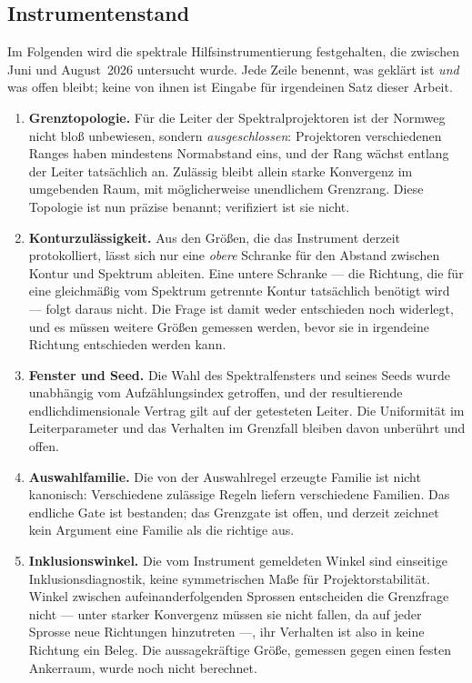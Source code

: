 \documentclass[12pt,a4paper]{article}
\theoremstyle{definition}
\theoremstyle{remark}
\begin{document}
\subsection{Instrumentenstand}

Im Folgenden wird die spektrale Hilfsinstrumentierung festgehalten, die
zwischen Juni und August~2026 untersucht wurde.  Jede Zeile benennt, was
geklärt ist \emph{und} was offen bleibt; keine von ihnen ist Eingabe für
irgendeinen Satz dieser Arbeit.
\begin{enumerate}[label=(I\arabic*)]
\item \textbf{Grenztopologie.}  Für die Leiter der Spektralprojektoren
  ist der Normweg nicht bloß unbewiesen, sondern \emph{ausgeschlossen}:
  Projektoren verschiedenen Ranges haben mindestens Normabstand eins,
  und der Rang wächst entlang der Leiter tatsächlich an.  Zulässig
  bleibt allein starke Konvergenz im umgebenden Raum, mit
  möglicherweise unendlichem Grenzrang.  Diese Topologie ist nun präzise
  benannt; verifiziert ist sie nicht.
\item \textbf{Konturzulässigkeit.}  Aus den Größen, die das Instrument
  derzeit protokolliert, lässt sich nur eine \emph{obere} Schranke für
  den Abstand zwischen Kontur und Spektrum ableiten.  Eine untere
  Schranke --- die Richtung, die für eine gleichmäßig vom Spektrum
  getrennte Kontur tatsächlich benötigt wird --- folgt daraus nicht.
  Die Frage ist damit weder entschieden noch widerlegt, und es müssen
  weitere Größen gemessen werden, bevor sie in irgendeine Richtung
  entschieden werden kann.
\item \textbf{Fenster und Seed.}  Die Wahl des Spektralfensters und
  seines Seeds wurde unabhängig vom Aufzählungsindex getroffen, und der
  resultierende endlichdimensionale Vertrag gilt auf der getesteten
  Leiter.  Die Uniformität im Leiterparameter und das Verhalten im
  Grenzfall bleiben davon unberührt und offen.
\item \textbf{Auswahlfamilie.}  Die von der Auswahlregel erzeugte Familie
  ist nicht kanonisch: Verschiedene zulässige Regeln liefern
  verschiedene Familien.  Das endliche Gate ist bestanden; das Grenzgate
  ist offen, und derzeit zeichnet kein Argument eine Familie als die
  richtige aus.
\item \textbf{Inklusionswinkel.}  Die vom Instrument gemeldeten Winkel
  sind einseitige Inklusionsdiagnostik, keine symmetrischen Maße für
  Projektorstabilität.  Winkel zwischen aufeinanderfolgenden Sprossen
  entscheiden die Grenzfrage nicht --- unter starker Konvergenz müssen
  sie nicht fallen, da auf jeder Sprosse neue Richtungen hinzutreten
  ---, ihr Verhalten ist also in keine Richtung ein Beleg.  Die
  aussagekräftige Größe, gemessen gegen einen festen Ankerraum, wurde
  noch nicht berechnet.
\end{enumerate}
\end{document}
